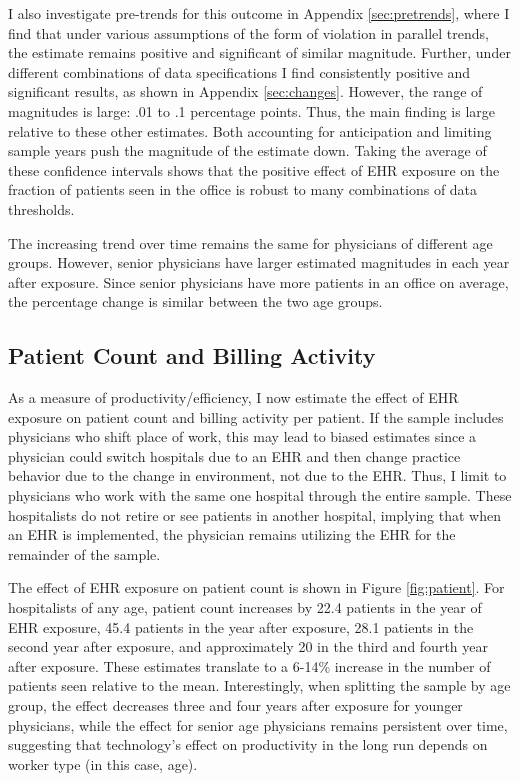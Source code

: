 \documentclass[12pt]{article}
\begin{document}
I also investigate pre-trends for this outcome in Appendix \ref{sec:pretrends}, where I find that under various assumptions of the form of violation in parallel trends, the estimate remains positive and significant of similar magnitude. Further, under different combinations of data specifications I find consistently positive and significant results, as shown in Appendix \ref{sec:changes}. However, the range of magnitudes is large: .01 to .1 percentage points. Thus, the main finding is large relative to these other estimates. Both accounting for anticipation and limiting sample years push the magnitude of the estimate down. Taking the average of these confidence intervals shows that the positive effect of EHR exposure on the fraction of patients seen in the office is robust to many combinations of data thresholds. 

The increasing trend over time remains the same for physicians of different age groups. However, senior physicians have larger estimated magnitudes in each year after exposure. Since senior physicians have more patients in an office on average, the percentage change is similar between the two age groups. 



\subsection{Patient Count and Billing Activity}\label{sec:patientcount}

As a measure of productivity/efficiency, I now estimate the effect of EHR exposure on patient count and billing activity per patient. If the sample includes physicians who shift place of work, this may lead to biased estimates since a physician could switch hospitals due to an EHR and then change practice behavior due to the change in environment, not due to the EHR. Thus, I limit to physicians who work with the same one hospital through the entire sample. These hospitalists do not retire or see patients in another hospital, implying that when an EHR is implemented, the physician remains utilizing the EHR for the remainder of the sample. 

The effect of EHR exposure on patient count is shown in Figure \ref{fig:patient}. For hospitalists of any age, patient count increases by 22.4 patients in the year of EHR exposure, 45.4 patients in the year after exposure, 28.1 patients in the second year after exposure, and approximately 20 in the third and fourth year after exposure. These estimates translate to a 6-14\% increase in the number of patients seen relative to the mean. Interestingly, when splitting the sample by age group, the effect decreases three and four years after exposure for younger physicians, while the effect for senior age physicians remains persistent over time, suggesting that technology's effect on productivity in the long run depends on worker type (in this case, age). 
\end{document}
